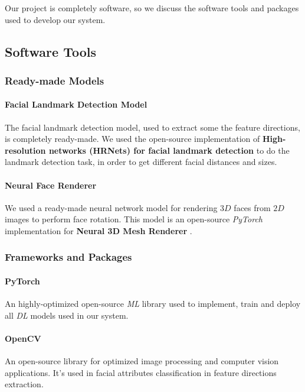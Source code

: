 Our project is completely software, so we discuss the software tools and packages used to develop our system.

\subsection{Software Tools}

\subsubsection{Ready-made Models}

\paragraph{Facial Landmark Detection Model}
The facial landmark detection model, used to extract some the feature directions, is completely ready-made. We used the open-source implementation of \textbf{High-resolution networks (HRNets) for facial landmark detection} \cite{sun2019highresolution} to do the landmark detection task, in order to get different facial distances and sizes.

\paragraph{Neural Face Renderer}
We used a ready-made neural network model for rendering $3D$ faces from $2D$ images to perform face rotation. This model is an open-source \emph{PyTorch} implementation for \textbf{Neural 3D Mesh Renderer} \cite{kato2017neural}.

\subsubsection{Frameworks and Packages}

\paragraph{PyTorch}
An highly-optimized open-source \emph{ML} library used to implement, train and deploy all \emph{DL} models used in our system.

\paragraph{OpenCV}
An open-source library for optimized image processing and computer vision applications. It's used in facial attributes classification in feature directions extraction.

